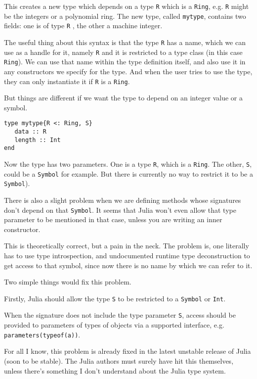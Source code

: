 \documentclass[a4paper,10pt]{article}
\newcommand{\code}{\lstinline}
\begin{document}
This creates a new type which depends on a type \code{R} which is a \code{Ring}, e.g. \code{R}  might
be the integers or a polynomial ring. The new type, called \code{mytype}, contains two fields: one is
of type \code{R} , the other a machine integer.

The useful thing about this syntax is that the type \code{R}  has a name, which we can use as a handle for
it, namely \code{R} and it is restricted to a type class (in this case \code{Ring}). We can use that name 
within the type definition itself, and also use it in any constructors we specify for the type. And when
the user tries to use the type, they can only instantiate it if \code{R} is a \code{Ring}.

But things are different if we want the type to depend on an integer value or a symbol.

\begin{lstlisting}
type mytype{R <: Ring, S}
   data :: R
   length :: Int
end
\end{lstlisting}

Now the type has two parameters. One is a type \code{R}, which is a \code{Ring}. The other, \code{S}, 
could be a \code{Symbol} for example. But there is currently no way to restrict it to be a 
\code{Symbol}). 

There is also a slight problem when we are defining methods whose signatures don't depend on that
\code{Symbol}. It seems that Julia won't even allow that type parameter to be mentioned in that case,
unless you are writing an inner constructor.

This is theoretically correct, but a pain in the neck. The problem is, one literally has to use type 
introspection, and undocumented runtime type deconstruction to get access to that symbol, since now
there is no name by which we can refer to it.

Two simple things would fix this problem.

Firstly, Julia should allow the type \code{S} to be restricted to a \code{Symbol} or \code{Int}.

When the signature does not include the type parameter \code{S}, access should be provided to parameters of
types of objects via a supported interface, e.g. \code{parameters(typeof(a))}.

For all I know, this problem is already fixed in the latest unstable release of Julia (soon to be stable).
The Julia authors must surely have hit this themselves, unless there's something I don't understand
about the Julia type system.
\end{document}
